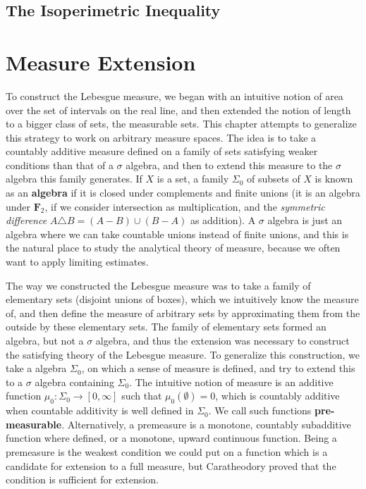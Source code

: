 \section{The Isoperimetric Inequality}



\chapter{Measure Extension}

To construct the Lebesgue measure, we began with an intuitive notion of area over the set of intervals on the real line, and then extended the notion of length to a bigger class of sets, the measurable sets. This chapter attempts to generalize this strategy to work on arbitrary measure spaces. The idea is to take a countably additive measure defined on a family of sets satisfying weaker conditions than that of a $\sigma$ algebra, and then to extend this measure to the $\sigma$ algebra this family generates. If $X$ is a set, a family $\Sigma_0$ of subsets of $X$ is known as an {\bf algebra} if it is closed under complements and finite unions (it is an algebra under $\mathbf{F}_2$, if we consider intersection as multiplication, and the {\it symmetric difference} $A \triangle B = (A - B) \cup (B - A)$ as addition). A $\sigma$ algebra is just an algebra where we can take countable unions instead of finite unions, and this is the natural place to study the analytical theory of measure, because we often want to apply limiting estimates.

The way we constructed the Lebesgue measure was to take a family of elementary sets (disjoint unions of boxes), which we intuitively know the measure of, and then define the measure of arbitrary sets by approximating them from the outside by these elementary sets. The family of elementary sets formed an algebra, but not a $\sigma$ algebra, and thus the extension was necessary to construct the satisfying theory of the Lebesgue measure. To generalize this construction, we take a algebra $\Sigma_0$, on which a sense of measure is defined, and try to extend this to a $\sigma$ algebra containing $\Sigma_0$. The intuitive notion of measure is an additive function $\mu_0: \Sigma_0 \to [0,\infty]$  such that $\mu_0(\emptyset) = 0$, which is countably additive when countable additivity is well defined in $\Sigma_0$. We call such functions {\bf pre-measurable}. Alternatively, a premeasure is a monotone, countably subadditive function where defined, or a monotone, upward continuous function. Being a premeasure is the weakest condition we could put on a function which is a candidate for extension to a full measure, but Caratheodory proved that the condition is sufficient for extension.

